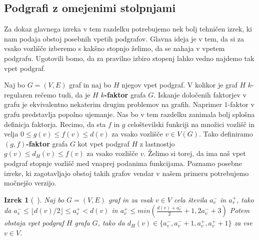 \documentclass[12pt,a4paper,twoside]{article}
\theoremstyle{definition} %
\theoremstyle{plain} %
\newtheorem{izrek}[definicija]{Izrek}
\numberwithin{equation}{section}  %
\begin{document}
\subsection{Podgrafi z omejenimi stolpnjami}
Za dokaz glavnega izreka v tem razdelku potrebujemo nek bolj tehničen izrek, ki nam podaja obstoj posebnih vpetih podgrafov. Glavna ideja je v tem, da si za vsako vozlišče izberemo s kakšno stopnjo želimo, da se nahaja v vpetem podgrafu. Ugotovili bomo, da za pravilno izbiro stopenj lahko vedno najdemo tak vpet podgraf.


Naj bo $G =(V, E)$ graf in naj bo $H$ njegov vpet podgraf. V kolikor je graf $H$ $k$-regularen rečemo tudi, da je $H$ \textbf{$k$-faktor} grafa $G$.  Iskanje določenih faktorjev v grafu je ekvivalentno nekaterim drugim problemov na grafih. Naprimer $1$-faktor v grafu predstavlja popolno ujemanje. Nas bo v tem razdelku zanimala bolj splošna definicja faktorja.  Recimo, da sta $f$ in $g$ celoštevilski funkciji na množici vozlišč in velja $0 \le g(v) \le f(v) \le d(v)$ za vsako vozlišče $v \in V(G)$. Tako definiramo \textbf{$(g,f)$-faktor} grafa $G$ kot vpet podgraf $H$ z lastnostjo $g(v) \le d_H(v) \le f(v)$ za vsako vozlišče $v$. Želimo si torej, da ima naš vpet podgraf stopnje vozlišč med vnaprej podanima funkcijama. Poznamo posebne izreke, ki zagotavljajo obstoj takih grafov vendar v našem primeru potrebujemo močnejšo verzijo.



\begin{izrek}[~\citet{random12}]
\label{factor}
Naj bo $G = (V, E)$ graf in za vsak $v \in V$ cela števila $a_v^-$ in $a_v^+$, tako da $a_v^- \le \lfloor d(v)/2 \rfloor \le a_v^+ < d(v)$ in $a_v^+ \le min \left( \frac{d(v) + a_v^-}{2} + 1, 2a_v^- + 3 \right)$ Potem obstaja vpet podgraf $H$ grafa $G$, tako da $d_H(v) \in \{ a_v^-, a_v^- + 1, a_v^+, a_v^+ + 1\}$ za vse $v \in V$.
\end{izrek}
\end{document}
